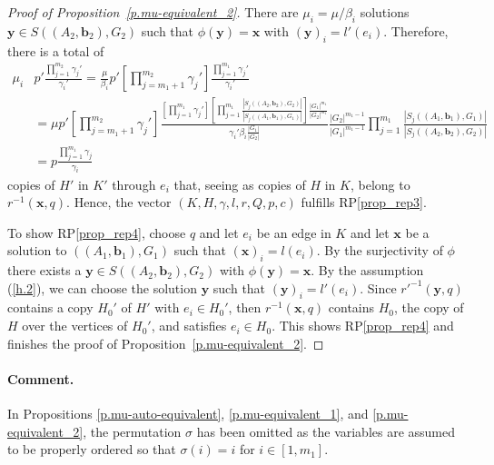 \documentclass[10pt]{article}
\begin{document}
\begin{proof}[Proof of Proposition~\ref{p.mu-equivalent_2}]
There are $\mu_i=\mu/\beta_i$ solutions $\mathbf{y}\in S((A_2,\mathbf{b}_2),G_2)$ such that $\phi(\mathbf{y})=\mathbf{x}$ with $(\mathbf{y})_i=l'(e_i)$. Therefore, there is a total of
\begin{align}
	\mu_i &p' \frac{\prod_{j=1}^{m_2} \gamma_j'}{\gamma_i'}
	=\frac{\mu}{\beta_i} p'
	\left[\prod_{j=m_1+1}^{m_2} \gamma_j' \right]\frac{\prod_{j=1}^{m_1} \gamma_j'}{\gamma_i'}\nonumber \\
	&= \mu {p'} \left[\prod_{j=m_1+1}^{m_2} \gamma_j'\right] 
	\frac{\left[\prod_{j=1}^{m_1} \gamma_j' \right] \left[\prod_{j=1}^{m_1}\frac{ |S_j((A_2,\mathbf{b}_2),G_2)|}{ |S_j((A_1,\mathbf{b}_1),G_1)|}\right] \frac{|G_1|^{m_1}}{|G_2|^{m_1}}}{\gamma_i' \beta_i \frac{|G_1|}{|G_2|} } \frac{|G_2|^{m_1-1}}{|G_1|^{m_1-1}} \prod_{j=1}^{m_1} \frac{ |S_j((A_1,\mathbf{b}_1),G_1)|}{ |S_j((A_2,\mathbf{b}_2),G_2)|} \nonumber \\
	&= p \frac{\prod_{j=1}^{m_1} \gamma_j}{\gamma_i} \nonumber
\end{align}
copies of $H'$ in $K'$ through $e_i$ that, seeing as copies of $H$ in $K$, belong to $r^{-1}(\mathbf{x},q)$. Hence, the vector $(K,H,\gamma,l,r,Q,p,c)$ fulfills RP\ref{prop_rep3}. 

To show RP\ref{prop_rep4}, choose $q$ and 
let $e_i$ be an edge in $K$ and 
let $\mathbf{x}$ be a solution to $((A_1,\mathbf{b}_1),G_1)$ such that $(\mathbf{x})_i=l(e_i)$. By the surjectivity of $\phi$ there exists a $\mathbf{y}\in S((A_2,\mathbf{b}_2),G_2)$ with $\phi(\mathbf{y})=\mathbf{x}$. By the assumption (\ref{h.2}), we can choose the solution $\mathbf{y}$ such that $(\mathbf{y})_i=l'(e_i)$. Since $r'^{-1}(\mathbf{y},q)$ contains a copy $H_0'$ of $H'$ with $e_i\in H_0'$, then 
$r^{-1}(\mathbf{x},q)$ contains $H_0$, the copy of $H$ over the vertices of $H_0'$, and satisfies $e_i\in H_0$. This shows RP\ref{prop_rep4} and finishes the proof of Proposition~\ref{p.mu-equivalent_2}.
\end{proof}




\paragraph{Comment.}
 In Propositions \ref{p.mu-auto-equivalent}, \ref{p.mu-equivalent_1}, and \ref{p.mu-equivalent_2}, the permutation $\sigma$ has been omitted as the variables are assumed to be properly ordered so that $\sigma(i)=i$ for $i\in[1,m_1]$.



\end{document}
